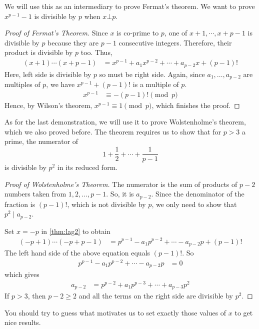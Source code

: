 \documentclass[12pt]{subfile}
\begin{document}
	We will use this as an intermediary to prove Fermat's theorem. We want to prove $x^{p-1}-1$ is divisible by $p$ when $x\bot p$.
		\begin{proof}[Proof of Fermat's Theorem]
			Since $x$ is co-prime to $p$, one of $x+1,\cdots,x+p-1$ is divisible by $p$ because they are $p-1$ consecutive integers. Therefore, their product is divisible by $p$ too. Thus,
				\begin{align*}
					(x+1)\cdots(x+p-1) & = x^{p-1}+a_1x^{p-2}+\cdots+a_{p-2}x+(p-1)!
				\end{align*}
			Here, left side is divisible by $p$ so must be right side. Again, since $a_1,\ldots,a_{p-2}$ are multiples of $p$, we have $x^{p-1}+(p-1)!$ is a multiple of $p$.
				\begin{align*}
					x^{p-1} & \equiv-(p-1)!\pmod p
				\end{align*}
			Hence, by Wilson's theorem, $x^{p-1} \equiv 1 \pmod p$, which finishes the proof.
		\end{proof}
	As for the last demonstration, we will use it to prove Wolstenholme's theorem, which we also proved before. The theorem requires us to show that for $p>3$ a prime, the numerator of $$1+\dfrac{1}{2}+\cdots+\dfrac{1}{p-1}$$ is divisible by $p^2$ in its reduced form.
		\begin{proof}[Proof of Wolstenholme's Theorem]
			The numerator is the sum of products of $p-2$ numbers taken from $1, 2, \ldots, p-1$. So, it is $a_{p-2}$. Since the denominator of the fraction is $(p-1)!$, which is not divisible by $p$, we only need to show that $p^2\mid a_{p-2}$.

			Set $x=-p$ in \autoref{thm:lag2} to obtain
				\begin{align*}
					(-p+1)\cdots(-p+p-1)
						& = p^{p-1}-a_1p^{p-2}+\cdots-a_{p-2}p+(p-1)!
				\end{align*}
			The left hand side of the above equation equals $(p-1)!$. So
				\begin{align*}
					p^{p-1}-a_1p^{p-2}+\cdots-a_{p-2}p
						& = 0
				\end{align*}
			which gives
				\begin{align*}
					a_{p-2}
						& = p^{p-2}+a_1p^{p-3}+\cdots+a_{p-3}p^2
				\end{align*}
			If $p>3$, then $p-2\geq 2$ and all the terms on the right side are divisible by $p^2$.
		\end{proof}

		\begin{note}
			You should try to guess what motivates us to set exactly those values of $x$ to get nice results.
		\end{note}
\end{document}
